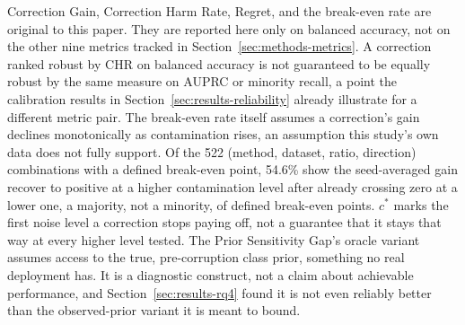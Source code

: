 Correction Gain, Correction Harm Rate, Regret, and the break-even rate
are original to this paper. They are reported here only on balanced
accuracy, not on the other nine metrics tracked in
Section~\ref{sec:methods-metrics}. A correction ranked robust by CHR
on balanced accuracy is not guaranteed to be equally robust by the
same measure on AUPRC or minority recall, a point the calibration
results in Section~\ref{sec:results-reliability} already illustrate
for a different metric pair. The break-even rate itself assumes a
correction's gain declines monotonically as contamination rises, an
assumption this study's own data does not fully support. Of the 522
(method, dataset, ratio, direction) combinations with a defined
break-even point, 54.6\% show the seed-averaged gain recover to
positive at a higher contamination level after already crossing zero
at a lower one, a majority, not a minority, of defined break-even
points. $c^*$ marks the first noise level a correction stops
paying off, not a guarantee that it stays that way at every higher
level tested. The Prior Sensitivity Gap's oracle
variant assumes access to the true, pre-corruption class prior,
something no real deployment has. It is a diagnostic construct, not a
claim about achievable performance, and Section~\ref{sec:results-rq4}
found it is not even reliably better than the observed-prior variant
it is meant to bound.
